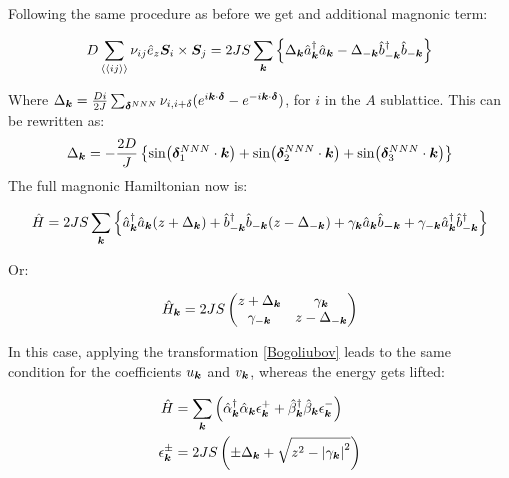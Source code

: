  Following the same procedure as before we get and additional magnonic term:

\begin{equation}
D \sum_{\langle \langle i j \rangle \rangle} \nu_{ij}\hat{e}_z \boldsymbol{S}_i \times \boldsymbol{S}_j = 2JS\sum_{\boldsymbol{k}} \left\{ \Delta_{\boldsymbol{k}}\hat{a}^\dagger_{\boldsymbol{k}}\hat{a}_{\boldsymbol{k}} - \Delta_{-\boldsymbol{k}}\hat{b}^\dagger_{-\boldsymbol{k}}\hat{b}_{-\boldsymbol{k}} \right\}
\end{equation}

Where $\Delta_{\boldsymbol{k}} = \frac{Di}{2J}\sum_{\boldsymbol{\delta}^{NNN}} \nu_{i,i+\delta} (e^{i\boldsymbol{k}\cdot\boldsymbol{\delta}} -e^{-i\boldsymbol{k}\cdot\boldsymbol{\delta}})$, for $i$ in the $A$ sublattice. This can be rewritten as:
\begin{equation}
\Delta_{\boldsymbol{k}} = -\frac{2D}{J}\left\{ \sin(\boldsymbol{\delta}^{NNN}_1 \cdot \boldsymbol{k}) + \sin(\boldsymbol{\delta}^{NNN}_2 \cdot \boldsymbol{k}) + \sin(\boldsymbol{\delta}^{NNN}_3 \cdot \boldsymbol{k})\right\}
\end{equation}
The full magnonic Hamiltonian now is:

\begin{equation}
\label{MagnonicH2}
\hat{H} = 2JS \sum_{\boldsymbol{k}} \left\{ \hat{a}^\dagger_{\boldsymbol{k}}\hat{a}_{\boldsymbol{k}}(z+\Delta_{\boldsymbol{k}}) + \hat{b}^\dagger_{-\boldsymbol{k}}\hat{b}_{-\boldsymbol{k}}(z-\Delta_{-\boldsymbol{k}}) + \gamma_{\boldsymbol{k}}\hat{a}_{\boldsymbol{k}}\hat{b}_{\boldsymbol{-k}} + \gamma_{-\boldsymbol{k}}\hat{a}^\dagger_{\boldsymbol{k}}\hat{b}^\dagger_{-\boldsymbol{k}} \right\}
\end{equation}

Or:

\begin{equation}
\hat{H}_{\boldsymbol{k}} = 2JS\begin{pmatrix} 
z + \Delta_{\boldsymbol{k}}& \gamma_{\boldsymbol{k}} \\
\gamma_{-\boldsymbol{k}} & z - \Delta_{-\boldsymbol{k}}
\end{pmatrix}
\end{equation}

In this case, applying the transformation \ref{Bogoliubov} leads to the same condition for the coefficients  $u_{\boldsymbol{k}}$ and $v_{\boldsymbol{k}}$, whereas the energy gets lifted:

\begin{align}
\hat{H} &= \sum_{\boldsymbol{k}} \left( \hat{\alpha}_{\boldsymbol{k}}^\dagger \hat{\alpha}_{\boldsymbol{k}} \epsilon_{\boldsymbol{k}}^+ +\hat{\beta}_{\boldsymbol{k}}^\dagger \hat{\beta}_{\boldsymbol{k}}  \epsilon_{\boldsymbol{k}}^- \right) \label{DispWithDMI} \\
\epsilon_{\boldsymbol{k}}^\pm &= 2JS \left( \pm \Delta_{\boldsymbol{k}} + \sqrt{z^2-\abs{\gamma_{\boldsymbol{k}}}^2} \right)
\end{align}

